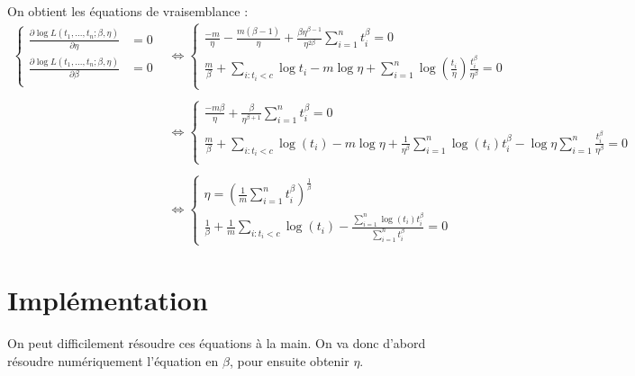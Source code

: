 \documentclass[a4paper]{report}
\begin{document}
     On obtient les équations de vraisemblance :
     \begin{align}
     	\begin{cases}
		\frac{\partial \log L(t_1,...,t_n;\beta,\eta)}{\partial \eta} & = 0 \nonumber\\
	 	\frac{\partial \log L(t_1,...,t_n;\beta,\eta)}{\partial \beta} & = 0 \nonumber\\
     	\end{cases}
     	&\iff 
      	\begin{cases}
		\frac{-m}{\eta} - \frac{m(\beta -1)}{\eta} + \frac{\beta \eta^{\beta-1}}		{\eta^{2\beta}} \sum_{i=1}^{n} {t_i^\beta} = 0  \nonumber\\
	 	\frac{m}{\beta} + \sum_{i:t_i<c}{\log t_i} - m \log \eta + \sum_{i=1}^{n} {\log (\frac{t_i}{\eta}) \frac{t_i^\beta}{\eta^\beta}} = 0  \nonumber\\
     	\end{cases}
   	\\
   	 \nonumber\\
   	&\iff
   	\begin{cases}
     		\frac{-m\beta}{\eta} + \frac{\beta}{\eta^{\beta+1}} \sum_{i=1}^{n} {t_i^\beta} = 0 \nonumber\\
		\frac{m}{\beta} +  \sum_{i:t_i<c}{\log (t_i)} - m\log \eta + \frac{1}{\eta^{\beta}} \sum_{i=1}^{n} {\log (t_i)} t_i^{\beta} - \log \eta \sum_{i=1}^{n} \frac{t_i^\beta}{\eta^\beta}  = 0 \nonumber\\
     	\end{cases}
     	\\
     	 \nonumber\\
     	&\iff
   	\begin{cases}
     		\eta = \left( \frac{1}{m}  \sum_{i=1}^{n} {t_i^\beta} \right)^\frac{1}{\beta} \label{eqEMV}\\
		\frac{1}{\beta} + \frac{1}{m} \sum_{i:t_i<c}{\log (t_i)} - \frac{\sum_{i=1}^{n}  {\log (t_i)} t_i^{\beta}}{\sum_{i=1}^{n} {t_i^{\beta}}}  = 0 
     	\end{cases}
\end{align}

\section{Implémentation \label{sec:impl}}

On peut difficilement résoudre ces équations à la main. On va donc d'abord résoudre numériquement l'équation en $\beta$, pour ensuite obtenir $\eta$.
\end{document}
